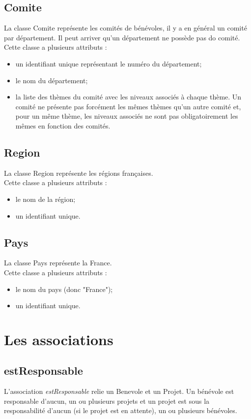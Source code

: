\documentclass[asi, sansVersion]{picInsa}
\begin{document}
\subsection*{Comite}

La classe Comite représente les comités de bénévoles, il y a en général un comité par département. Il peut arriver qu'un département ne possède pas do comité.\\
Cette classe a plusieurs attributs :
\begin{itemize}
\item un identifiant unique représentant le numéro du département;
\item le nom du département;
\item la liste des thèmes du comité avec les niveaux associés à chaque thème. Un comité ne présente pas forcément les mêmes thèmes qu'un autre comité et, pour un même thème, les niveaux associés ne sont pas obligatoirement les mêmes en fonction des comités. 
\end{itemize}

\subsection*{Region}

La classe Region représente les régions françaises.\\
Cette classe a plusieurs attributs :
\begin{itemize}
\item le nom de la région;
\item un identifiant unique.
\end{itemize}

\subsection*{Pays}

La classe Pays représente la France.\\
Cette classe a plusieurs attributs :
\begin{itemize}
\item le nom du pays (donc "France");
\item un identifiant unique.
\end{itemize}


\section{Les associations}

\subsection*{estResponsable}
L'association \textit{estResponsable} relie un Benevole et un Projet. Un bénévole est responsable d'aucun, un ou plusieurs projets et un projet est sous la responsabilité d'aucun (si le projet est en attente), un ou plusieurs bénévoles.
\end{document}
